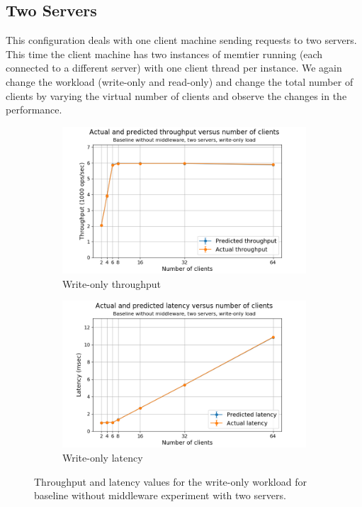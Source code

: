 \documentclass[11pt,a4paper]{article}
\begin{document}
\subsection{Two Servers} \label{sec:csb2}
This configuration deals with one client machine sending requests to two servers. This time the client machine has two instances of memtier running (each connected to a different server) with one client thread per instance. We again change the workload (write-only and read-only) and change the total number of clients by varying the virtual number of clients and observe the changes in the performance.

\begin{figure}[h]
\centering
\begin{subfigure}{.5\textwidth}
  \centering
  \includegraphics[width=1.0\linewidth,trim={20px 0px 35px 0px},clip]{img/plot/csb2-wo-law_tpt.png}
  \caption{Write-only throughput}
  \label{fig:csb2-wo-law_tpt}
\end{subfigure}%
\begin{subfigure}{.5\textwidth}
  \centering
  \includegraphics[width=1.0\linewidth,trim={20px 0px 40px 0px},clip]{img/plot/csb2-wo-law_lat.png}
  \caption{Write-only latency}
  \label{fig:csb2-wo-law_lat}
\end{subfigure}
\caption{Throughput and latency values for the write-only workload for baseline without middleware experiment with two servers.}
\label{fig:csb2-wo-law}
\end{figure}
\end{document}
